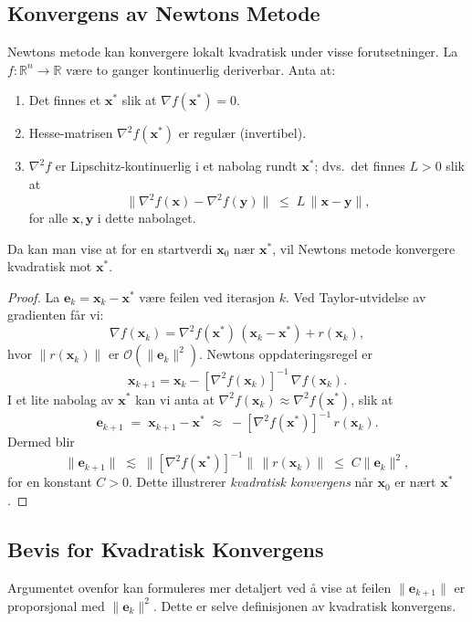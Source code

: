 \subsection{Konvergens av Newtons Metode}
Newtons metode kan konvergere lokalt kvadratisk under visse forutsetninger. La \( f : \mathbb{R}^n \to \mathbb{R} \) være to ganger kontinuerlig deriverbar. Anta at:

\begin{enumerate}
  \item Det finnes et \(\symbf{x}^*\) slik at \(\nabla f(\symbf{x}^*) = 0\).
  \item Hesse-matrisen \(\nabla^2 f(\symbf{x}^*)\) er regulær (invertibel).
  \item \(\nabla^2 f\) er Lipschitz-kontinuerlig i et nabolag rundt \(\symbf{x}^*\); dvs.\ det finnes \( L > 0 \) slik at
        \[
          \| \nabla^2 f(\symbf{x}) - \nabla^2 f(\symbf{y}) \|
          \;\le\;
          L\,\|\symbf{x} - \symbf{y}\|,
        \]
        for alle \(\symbf{x}, \symbf{y}\) i dette nabolaget.
\end{enumerate}

Da kan man vise at for en startverdi \(\symbf{x}_0\) nær \(\symbf{x}^*\), vil Newtons metode konvergere kvadratisk mot \(\symbf{x}^*\).

\begin{proof}{}{}
  La \(\symbf{e}_k = \symbf{x}_k - \symbf{x}^*\) være feilen ved iterasjon \(k\).
  Ved Taylor-utvidelse av gradienten får vi:
  \[
    \nabla f(\symbf{x}_k)
    = \nabla^2 f(\symbf{x}^*)\,(\symbf{x}_k - \symbf{x}^*) + r(\symbf{x}_k),
  \]
  hvor \(\|r(\symbf{x}_k)\|\) er \(\mathcal{O}(\|\symbf{e}_k\|^2)\). Newtons oppdateringsregel er
  \[
    \symbf{x}_{k+1}
    = \symbf{x}_k
    - [\nabla^2 f(\symbf{x}_k)]^{-1}\,\nabla f(\symbf{x}_k).
  \]
  I et lite nabolag av \(\symbf{x}^*\) kan vi anta at
  \(\nabla^2 f(\symbf{x}_k)\approx \nabla^2 f(\symbf{x}^*)\), slik at
  \[
    \symbf{e}_{k+1}
    \;=\; \symbf{x}_{k+1} - \symbf{x}^*
    \;\approx\;
    -[\nabla^2 f(\symbf{x}^*)]^{-1}\,r(\symbf{x}_k).
  \]
  Dermed blir
  \[
    \|\symbf{e}_{k+1}\|
    \;\lesssim\;
    \|[\nabla^2 f(\symbf{x}^*)]^{-1}\|\,
    \|r(\symbf{x}_k)\|
    \;\le\;
    C \|\symbf{e}_k\|^2,
  \]
  for en konstant \(C>0\). Dette illustrerer \textit{kvadratisk konvergens} når \(\symbf{x}_0\) er nært \(\symbf{x}^*\).
\end{proof}

\subsection{Bevis for Kvadratisk Konvergens}
\label{sec:newton_quadratic_convergence}
Argumentet ovenfor kan formuleres mer detaljert ved å vise at feilen \(\|\symbf{e}_{k+1}\|\) er proporsjonal med \(\|\symbf{e}_k\|^2\). Dette er selve definisjonen av kvadratisk konvergens.

